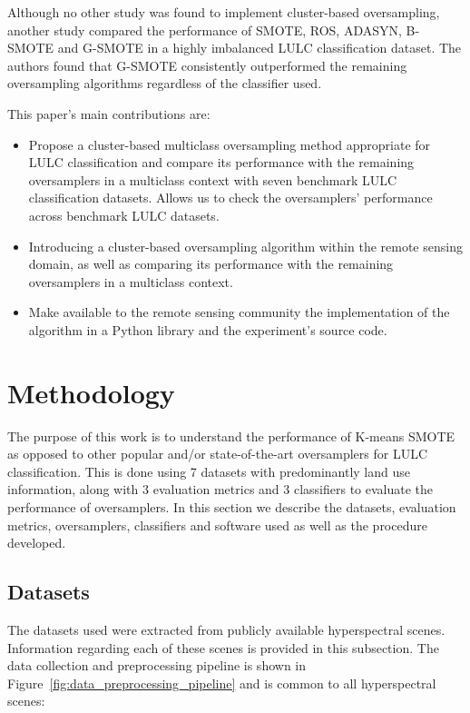 \documentclass[information,article,submit,moreauthors,pdftex]{Definitions/mdpi}
\begin{document}
\begin{paracol}{2}
\linenumbers
\switchcolumn

Although no other study was found to implement cluster-based oversampling,
another study \citep{Douzas2019rs} compared the performance of SMOTE, ROS,
ADASYN, B-SMOTE and G-SMOTE in a highly imbalanced LULC classification dataset.
The authors found that G-SMOTE consistently outperformed the remaining
oversampling algorithms regardless of the classifier used.

This paper's main contributions are:
\begin{itemize}
    \item Propose a cluster-based multiclass oversampling method appropriate
        for LULC classification and compare its performance with the remaining
        oversamplers in a multiclass context with seven benchmark LULC
        classification datasets. Allows us to check the oversamplers'
        performance across benchmark LULC datasets.
    \item Introducing a cluster-based oversampling algorithm within the remote
        sensing domain, as well as comparing its performance with the remaining
        oversamplers in a multiclass context.
    \item Make available to the remote sensing community the implementation
        of the algorithm in a Python library and the experiment's source code.
\end{itemize}

\section{Methodology}\label{sec:methodology}

The purpose of this work is to understand the performance of K-means SMOTE as
opposed to other popular and/or state-of-the-art oversamplers for LULC
classification. This is done using 7 datasets with predominantly land use
information, along with 3 evaluation metrics and 3 classifiers to evaluate the
performance of oversamplers. In this section we describe the datasets,
evaluation metrics, oversamplers, classifiers and software used as well as the
procedure developed.

\subsection{Datasets}

The datasets used were extracted from publicly available hyperspectral scenes.
Information regarding each of these scenes is provided in this subsection.
The data collection and preprocessing pipeline is shown in
Figure~\ref{fig:data_preprocessing_pipeline} and is common to all
hyperspectral scenes:


\end{paracol}
\end{document}
